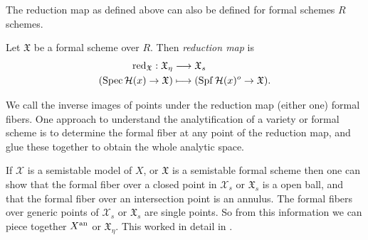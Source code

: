 The reduction map as defined above can also be defined for formal schemes $R$ schemes.  
\begin{definition}
	Let $\mathfrak{X} $ be a formal scheme over $R$. 
	Then \emph{reduction map} is 
	\begin{align*}
		\operatorname{red}_{\mathfrak X}:  \mathfrak{X} _\eta &\longrightarrow \mathfrak{X} _s \\
		(\operatorname{Spec} \mathcal H(x) \to \mathfrak X) &\longmapsto (\operatorname{Spf} \mathcal H(x)^o \to \mathfrak X)
	.\end{align*}
\end{definition}

We call the inverse images of points under the reduction map (either one) formal fibers. 
One approach to understand the analytification of a variety or formal scheme is to determine the formal fiber at any point of the reduction map, and glue these together to obtain the whole analytic space. 

If $\mathscr X$ is a semistable model of $X$, or $\mathfrak{X} $ is a semistable formal scheme then one can show that the formal fiber over a closed point in $\mathscr X_s$ or $\mathfrak{X} _s$ is a open ball, and that the formal fiber over an intersection point is an annulus. 
The formal fibers over generic points of $\mathscr X_s$ or $\mathfrak{X} _s$ are single points. 
So from this information we can piece together $X{}^{\text{an}}$ or  $\mathfrak{X} _\eta$. 
This worked in detail in \cite{bakerStructureNonarchimedeanAnalytic2013}.



